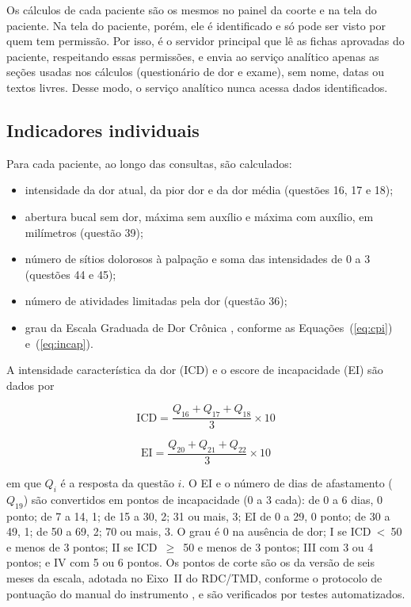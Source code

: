 Os cálculos de cada paciente são os mesmos no painel da coorte e na tela do paciente. Na tela do paciente, porém, ele é identificado e só pode ser visto por quem tem permissão. Por isso, é o servidor principal que lê as fichas aprovadas do paciente, respeitando essas permissões, e envia ao serviço analítico apenas as seções usadas nos cálculos (questionário de dor e exame), sem nome, datas ou textos livres. Desse modo, o serviço analítico nunca acessa dados identificados.

\subsection{Indicadores individuais}

Para cada paciente, ao longo das consultas, são calculados:

\begin{itemize}
	\item intensidade da dor atual, da pior dor e da dor média (questões 16, 17 e 18);
	\item abertura bucal sem dor, máxima sem auxílio e máxima com auxílio, em milímetros (questão 39);
	\item número de sítios dolorosos à palpação e soma das intensidades de 0 a 3 (questões 44 e 45);
	\item número de atividades limitadas pela dor (questão 36);
	\item grau da Escala Graduada de Dor Crônica \cite{vonkorff1992}, conforme as Equações~(\ref{eq:cpi}) e~(\ref{eq:incap}).
\end{itemize}

A intensidade característica da dor (ICD) e o escore de incapacidade (EI) são dados por

\begin{equation}
	\label{eq:cpi}
	\mathrm{ICD} = \frac{Q_{16} + Q_{17} + Q_{18}}{3} \times 10
\end{equation}

\begin{equation}
	\label{eq:incap}
	\mathrm{EI} = \frac{Q_{20} + Q_{21} + Q_{22}}{3} \times 10
\end{equation}

\noindent em que $Q_i$ é a resposta da questão $i$. O EI e o número de dias de afastamento ($Q_{19}$) são convertidos em pontos de incapacidade (0 a 3 cada): de 0 a 6 dias, 0 ponto; de 7 a 14, 1; de 15 a 30, 2; 31 ou mais, 3; EI de 0 a 29, 0 ponto; de 30 a 49, 1; de 50 a 69, 2; 70 ou mais, 3. O grau é 0 na ausência de dor; I se ICD~<~50 e menos de 3 pontos; II se ICD~$\geq$~50 e menos de 3 pontos; III com 3 ou 4 pontos; e IV com 5 ou 6 pontos. Os pontos de corte são os da versão de seis meses da escala, adotada no Eixo~II do RDC/TMD, conforme o protocolo de pontuação do manual do instrumento \cite{vonkorff1992,dworkin1992,rdcmanual}, e são verificados por testes automatizados.

